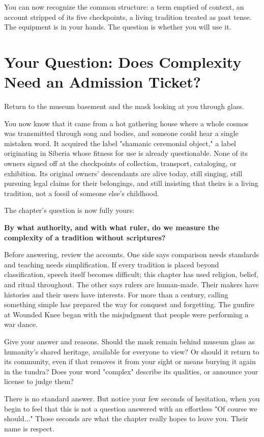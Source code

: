 You can now recognize the common structure: a term emptied of context, an account stripped of its five checkpoints, a living tradition treated as past tense. The equipment is in your hands. The question is whether you will use it.

\section[Who May Judge Complexity?]{Your Question: Does Complexity Need an Admission Ticket?}
Return to the museum basement and the mask looking at you through glass.

You now know that it came from a hot gathering house where a whole cosmos was transmitted through song and bodies, and someone could hear a single mistaken word. It acquired the label "shamanic ceremonial object," a label originating in Siberia whose fitness for use is already questionable. None of its owners signed off at the checkpoints of collection, transport, cataloging, or exhibition. Its original owners' descendants are alive today, still singing, still pursuing legal claims for their belongings, and still insisting that theirs is a living tradition, not a fossil of someone else's childhood.

The chapter's question is now fully yours:

\textbf{By what authority, and with what ruler, do we measure the complexity of a tradition without scriptures?}

Before answering, review the accounts. One side says comparison needs standards and teaching needs simplification. If every tradition is placed beyond classification, speech itself becomes difficult; this chapter has used religion, belief, and ritual throughout. The other says rulers are human-made. Their makers have histories and their users have interests. For more than a century, calling something simple has prepared the way for conquest and forgetting. The gunfire at Wounded Knee began with the misjudgment that people were performing a war dance.

Give your answer and reasons. Should the mask remain behind museum glass as humanity's shared heritage, available for everyone to view? Or should it return to its community, even if that removes it from your sight or means burying it again in the tundra? Does your word "complex" describe its qualities, or announce your license to judge them?

There is no standard answer. But notice your few seconds of hesitation, when you begin to feel that this is not a question answered with an effortless "Of course we should..." Those seconds are what the chapter really hopes to leave you. Their name is respect.
